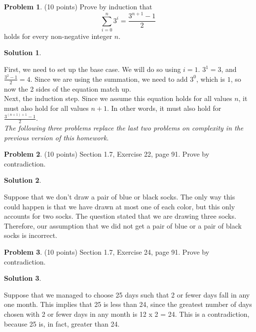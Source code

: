 \documentclass{article}
\theoremstyle{definition}
\newtheorem{problem}{Problem}
\newtheorem*{solution}{Solution}
\begin{document}
\begin{problem} (10 points)
Prove by induction that
$$\sum_{i=0}^n 3^i = \frac{3^{n+1}-1}{2}$$
holds for every non-negative integer $n$.
\end{problem}
\begin{solution}
\end{solution}		\noindent First, we need to set up the base case. We will do so using $i = 1$. $3^1 = 3$, 					and $\frac{3^2 - 1}{2} = 4$. Since we are using the summation, we need to add $3^0$, 					which is $1$, so now the 2 sides of the equation match up. \\
				Next, the induction step. Since we assume this equation holds for all values $n$, it must 					also hold for all values $n+1$. In other words, it must also hold for $\frac{3^{(n+1)+1}-1}{2}$.				\\

\textsl{The following three problems replace the last two problems on complexity in the 
previous version of this homework.}

\begin{problem} (10 points)
Section 1.7, Exercise 22, page 91.  Prove by contradiction.
\end{problem}
\begin{solution}
\end{solution}		\noindent Suppose that we don't draw a pair of blue or black socks. The only way this could 				happen is that we have drawn at most one of each color, but this only accounts for two 					socks. The question stated that we are drawing three socks. Therefore, our assumption that 				we did not get a pair of blue or a pair of black socks is incorrect.

\begin{problem} (10 points)
Section 1.7, Exercise 24, page 91.  Prove by contradiction.
\end{problem}
\begin{solution}
\end{solution}		\noindent Suppose that we managed to choose 25 days such that 2 or fewer days fall in any 				one month. This implies that 25 is less than 24, since the greatest number of days chosen 				with 2 or fewer days in any month is 12 x 2 = 24. This is a contradiction, because 25 is, in 					fact, greater than 24. 
\end{document}
